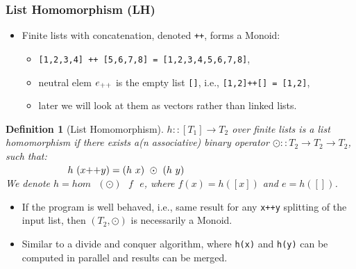 \documentclass{beamer}
\renewcommand{\emph}[1]{\textcolor{structure}{#1}}
\newcommand{\emp}[1]{\textcolor{DikuRed}{ #1}}
\newtheorem{mydef}{Definition}
\begin{document}
\begin{frame}
  \frametitle{List Homomorphism (LH)}

\begin{itemize}
    \item Finite lists with concatenation, denoted {\tt ++}, forms a Monoid:
        \begin{itemize}
            \item {\tt [1,2,3,4] ++ [5,6,7,8] = [1,2,3,4,5,6,7,8]},
            \item neutral elem $e_{\tt++}$ is the empty list {\tt[]}, 
                i.e., {\tt [1,2]++[] = [1,2]},
            \item later we will look at them as \emph{vectors} rather 
                    than \alert{linked lists}.
        \end{itemize}
\end{itemize}

\begin{mydef}[List Homomorphism]\label{LHomDef}
$h :: [T_1] \rightarrow T_2$ over finite lists is a {\em list homomorphism}
if there exists a(n associative) binary operator $\odot :: T_2 \rightarrow T_2 \rightarrow T_2$,
such that: \\
$\mbox{ }\mbox{ }\mbox{ }\mbox{ }\mbox{ }\mbox{ }\mbox{ }\mbox{ }\mbox{ }$
\emp{$h \mbox{ } (x{\tt ++}y) = (h\mbox{ }x)\mbox{ }\odot\mbox{ }(h\mbox{ }y)$} \\
We denote $h = hom \mbox{ }(\odot) \mbox{ }f\mbox{ }e$, where $f(x) = h([x])$ 
and $e = h([])$. 
\end{mydef}

\begin{itemize}
    \item If the program is well behaved, i.e., same result
            for any {\tt x++y} splitting of the input list, 
            then $(T_2,\odot)$ is necessarily a Monoid.\smallskip

    \item Similar to a divide and conquer algorithm, where 
            {\tt h(x)} and {\tt h(y)} can be computed in parallel 
            and results can be merged. 
\end{itemize}
\end{frame}
\end{document}
